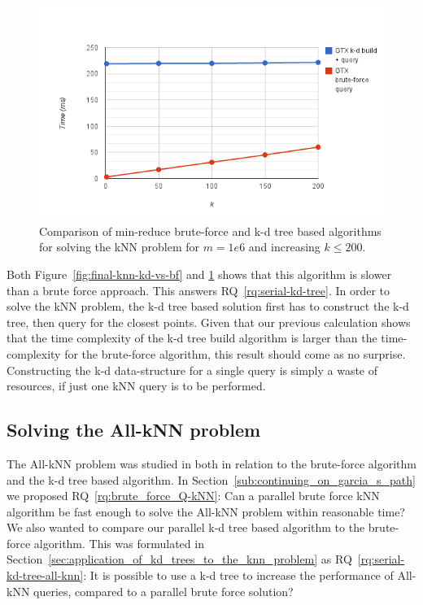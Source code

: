 \begin{figure}[ht!]
    \centering
    \includegraphics[width=120mm]{../gfx/final-var-knn-kd-vs-bf.png}
    \caption{Comparison of min-reduce brute-force and k-d tree based algorithms for solving the kNN problem for $m=1e6$ and increasing $k\le200$.}
    \label{fig:final-var-knn-kd-vs-bf}
\end{figure}

Both Figure~\ref{fig:final-knn-kd-vs-bf} and \ref{fig:final-var-knn-kd-vs-bf} shows that this algorithm is slower than a brute force approach. This answers RQ~\ref{rq:serial-kd-tree}. In order to solve the kNN problem, the k-d tree based solution first has to construct the k-d tree, then query for the closest points. Given that our previous calculation shows that the time complexity of the k-d tree build algorithm is larger than the time-complexity for the brute-force algorithm, this result should come as no surprise. Constructing the k-d data-structure for a single query is simply a waste of resources, if just one kNN query is to be performed.

\subsection{Solving the All-kNN problem} %
\label{sub:solving_the_all_knn_problem}

The All-kNN problem was studied in both in relation to the brute-force algorithm and the k-d tree based algorithm. In Section~\ref{sub:continuing_on_garcia_s_path} we proposed RQ~\ref{rq:brute_force_Q-kNN}: Can a parallel brute force kNN algorithm be fast enough to solve the All-kNN problem within reasonable time? We also wanted to compare our parallel k-d tree based algorithm to the brute-force algorithm. This was formulated in Section~\ref{sec:application_of_kd_trees_to_the_knn_problem} as RQ~\ref{rq:serial-kd-tree-all-knn}: It is possible to use a k-d tree to increase the performance of All-kNN queries, compared to a parallel brute force solution?

